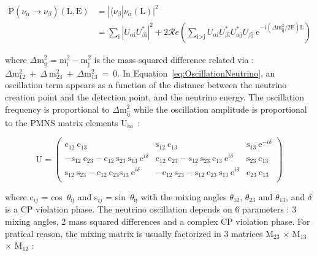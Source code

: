 \documentclass[main.tex]{subfiles}
\begin{document}
 
\begin{equation}\label{eq:OscillationNeutrino}
\begin{split}
\text{P} (\nu_\alpha \rightarrow \nu_\beta) (\text{L},\text{E}) & = |\langle \nu_\beta|\nu_\alpha(\text{L})|^\text{2} \\[0.2cm]
 & = \sum_\text{i} |U_{\alpha\text{i}}U_{\beta\text{i}}^*|^\text{2} + 2 \mathcal{R}e \left( \sum_\text{i>j} U_{\alpha\text{i}}U_{\beta\text{i}}^*U_{\alpha\text{j}}^*U_{\beta\text{j}}~\text{e}^{-i(\Delta\text{m}_\text{ij}^\text{2}/\text{2E})\text{L}}  \right)
\end{split}
\end{equation}


\NI where $\Delta \text{m}_{\text{ij}}^\text{2} = \text{m}_\text{i}^\text{2} - \text{m}_\text{j}^\text{2}$ is the mass squared difference related via : $\Delta \text{m}_{\text{12}}^\text{2}~+~\Delta~\text{m}_{\text{23}}^\text{2}~+~\Delta \text{m}_{\text{13}}^\text{2}~=~\text{0}$. In Equation~\ref{eq:OscillationNeutrino}, an oscillation term appears as a function of the distance between the neutrino creation point and the detection point, and the neutrino energy. The oscillation frequency is proportional to $\Delta \text{m}_{\text{ij}}^\text{2}$ while the oscillation amplitude is proportional to the PMNS matrix elements U$_{\alpha\text{i}}$~:


\begin{equation}
\text{U} = \left( \begin{array}{ccc}
\text{c}_{\text{12}}~\text{c}_{\text{13}} & \text{s}_{\text{12}}~\text{c}_{\text{13}} & \text{s}_{\text{13}}~\text{e}^{-i\delta} \\
-\text{s}_{\text{12}}~\text{c}_{\text{23}} - \text{c}_{\text{12}}~\text{s}_{\text{23}}~\text{s}_{\text{13}}~\text{e}^{i\delta} & \text{c}_{\text{12}}~\text{c}_{\text{23}} - \text{s}_{\text{12}}~\text{s}_{\text{23}}~\text{c}_{\text{13}}~\text{e}^{i\delta}  & \text{s}_{\text{23}}~\text{c}_{\text{13}} \\
\text{s}_{\text{12}}~\text{s}_{\text{23}} - \text{c}_{\text{12}}~\text{c}_{\text{23}} \text{s}_{\text{13}}~\text{e}^{i\delta} & -\text{c}_{\text{12}}~\text{s}_{\text{23}} - \text{s}_{\text{12}}~\text{c}_{\text{23}}~\text{s}_{\text{13}}~\text{e}^{i\delta} & \text{c}_{\text{23}}~\text{c}_{\text{13}} \\
\end{array} \right)
\end{equation}


\NI where c$_{ij}$ = cos~$\theta_{\text{ij}}$ and s$_{ij}$ = sin~$\theta_{\text{ij}}$ with the mixing angles $\theta_{\text{12}}$, $\theta_{\text{23}}$ and $\theta_{\text{13}}$, and $\delta$ is a CP violation phase. The neutrino oscillation depends on 6 parameters : 3 mixing angles, 2 mass squared differences and a complex CP violation phase. For pratical reason, the mixing matrix is usually factorized in 3 matrices M$_{\text{23}}$ $\times$ M$_{\text{13}}$ $\times$ M$_{\text{12}}$ :  
   
\end{document}
